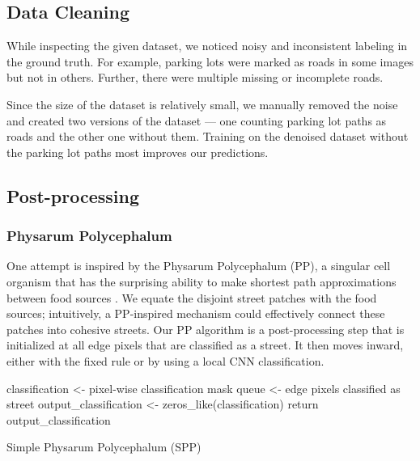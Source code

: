 \subsection{Data Cleaning}
While inspecting the given dataset, we noticed noisy and inconsistent labeling in the ground truth.
For example, parking lots were marked as roads in some images but not in others.
Further, there were multiple missing or incomplete roads.

Since the size of the dataset is relatively small, we manually removed the noise and created two versions of the dataset --- one counting parking lot paths as roads and the other one without them.
Training on the denoised dataset without the parking lot paths most improves our predictions.

\subsection{Post-processing}

    \subsubsection{Physarum Polycephalum}\label{novelties:spp}
        One attempt is inspired by the Physarum Polycephalum (PP), a singular cell organism that has the surprising ability to make shortest path approximations between food sources \cite{nakagaki2001smart}.
        We equate the disjoint street patches with the food sources; intuitively, a PP-inspired mechanism could effectively connect these patches into cohesive streets.
        Our PP algorithm is a post-processing step that is initialized at all edge pixels that are classified as a street.
        It then moves inward, either with the fixed rule or by using a local CNN classification.
        
    \begin{algorithm}
        \SetAlgoLined
         classification <- pixel-wise classification mask\;
         queue <- edge pixels classified as street\;
         output\_classification <- zeros\_like(classification)\;
         return output\_classification\;
        \caption{Simple Physarum Polycephalum (SPP)}
        \label{alg:spp-code}
    \end{algorithm}
    

